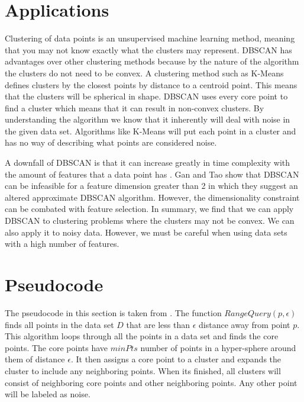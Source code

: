 \documentclass{article}
\begin{document}
\section{Applications}
Clustering of data points is an unsupervised machine learning method, meaning that you may not know exactly what the clusters may represent. DBSCAN has advantages over other clustering methods because by the nature of the algorithm the clusters do not need to be convex. A clustering method such as K-Means defines clusters by the closest points by distance to a centroid point. This means that the clusters will be spherical in shape. DBSCAN uses every core point to find a cluster which means that it can result in non-convex clusters. By understanding the algorithm we know that it inherently will deal with noise in the given data set. Algorithms like K-Means will put each point in a cluster and has no way of describing what points are considered noise.

A downfall of DBSCAN is that it can increase greatly in time complexity with the amount of features that a data point has \cite{Gan:2015:DRM:2723372.2737792}. Gan and Tao \cite{Gan:2015:DRM:2723372.2737792} show that DBSCAN can be infeasible for a feature dimension greater than 2 in which they suggest an altered approximate DBSCAN algorithm. However, the dimensionality constraint can be combated with feature selection. In summary, we find that we can apply DBSCAN to clustering problems where the clusters may not be convex. We can also apply it to noisy data. However, we must be careful when using data sets with a high number of features.

\section{Pseudocode}
The pseudocode in this section is taken from \cite{gunawan2013faster}. The function $RangeQuery(p, \epsilon)$ finds all points in the data set $D$ that are less than $\epsilon$ distance away from point $p$. This algorithm loops through all the points in a data set and finds the core points. The core points have $minPts$ number of points in a hyper-sphere around them of distance $\epsilon$. It then assigns a core point to a cluster and expands the cluster to include any neighboring points. When its finished, all clusters will consist of neighboring core points and other neighboring points. Any other point will be labeled as noise.
\end{document}
